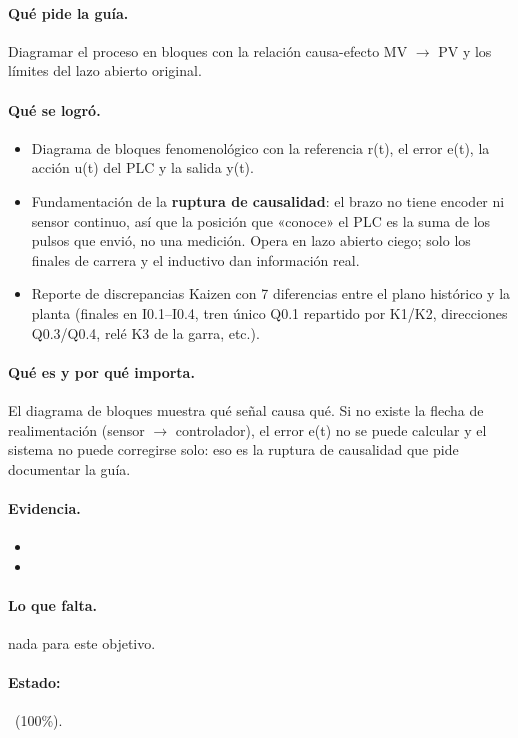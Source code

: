 \documentclass[a4paper,11pt]{article}
\begin{document}
\paragraph{Qué pide la guía.} Diagramar el proceso en bloques con la relación causa-efecto MV $\to$ PV y los límites del lazo abierto original.
\paragraph{Qué se logró.}
\begin{itemize}
\item Diagrama de bloques fenomenológico con la referencia r(t), el error e(t), la acción u(t) del PLC y la salida y(t).
\item Fundamentación de la \textbf{ruptura de causalidad}: el brazo no tiene encoder ni sensor continuo, así que la posición que «conoce» el PLC es la suma de los pulsos que envió, no una medición. Opera en lazo abierto ciego; solo los finales de carrera y el inductivo dan información real.
\item Reporte de discrepancias Kaizen con 7 diferencias entre el plano histórico y la planta (finales en I0.1–I0.4, tren único Q0.1 repartido por K1/K2, direcciones Q0.3/Q0.4, relé K3 de la garra, etc.).
\end{itemize}
\paragraph{Qué es y por qué importa.} El diagrama de bloques muestra qué señal causa qué. Si no existe la flecha de realimentación (sensor $\to$ controlador), el error e(t) no se puede calcular y el sistema no puede corregirse solo: eso es la ruptura de causalidad que pide documentar la guía.
\paragraph{Evidencia.}
\begin{itemize}\small
\item {}
\item {}
\end{itemize}
\paragraph{Lo que falta.} nada para este objetivo.
\paragraph{Estado:} \cumple~(100\%).
\end{document}

